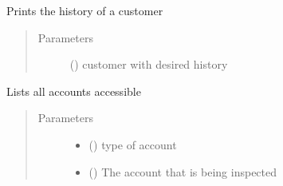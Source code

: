 \documentclass[letterpaper,10pt,english]{sphinxmanual}
\begin{document}

\begin{fulllineitems}
\label{\detokenize{bank:bank.terminalFunctions.history}}
Prints the history of a customer
\begin{quote}\begin{description}
\item[{Parameters}] \leavevmode
{} () \textendash{} customer with desired history

\end{description}\end{quote}

\end{fulllineitems}


\begin{fulllineitems}
\label{\detokenize{bank:bank.terminalFunctions.ls}}
Lists all accounts accessible
\begin{quote}\begin{description}
\item[{Parameters}] \leavevmode\begin{itemize}
\item {} 
 () \textendash{} type of account

\item {} 
 ({\hyperref[\detokenize{bank:bank.customer.Customer}]{}}) \textendash{} The account that is being inspected

\end{itemize}

\end{description}\end{quote}

\end{fulllineitems}

\end{document}
